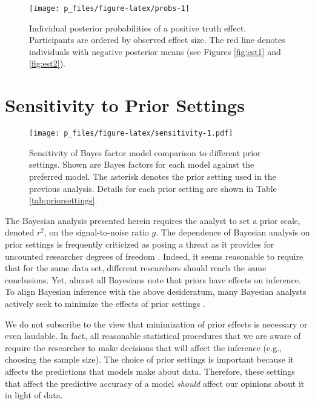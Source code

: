 \documentclass[
  english,
  ,man,floatsintext]{apa6}
\begin{document}
\begin{figure}
\texttt{[image: p\_files/figure-latex/probs-1]} \caption{Individual posterior probabilities of a positive truth effect. Participants are ordered by observed effect size. The red line denotes individuals with negative posterior means (see Figures \ref{fig:est1} and \ref{fig:est2}).}\label{fig:probs}
\end{figure}

\hypertarget{sensitivity-to-prior-settings}{%
\section{Sensitivity to Prior Settings}\label{sensitivity-to-prior-settings}}

\begin{figure}
\centering
\texttt{[image: p\_files/figure-latex/sensitivity-1.pdf]}
\caption{\label{fig:sensitivity}Sensitivity of Bayes factor model comparison to different prior settings. Shown are Bayes factors for each model against the preferred model. The asterisk denotes the prior setting used in the previous analysis. Details for each prior setting are shown in Table \ref{tab:priorsettings}.}
\end{figure}

The Bayesian analysis presented herein requires the analyst to set a prior scale, denoted \(r^2\), on the signal-to-noise ratio \(g\). The dependence of Bayesian analysis on prior settings is frequently criticized as posing a threat as it provides for uncounted researcher degrees of freedom \autocite{Simmons:etal:2011}. Indeed, it seems reasonable to require that for the same data set, different researchers should reach the same conclusions. Yet, almost all Bayesians note that priors have effects on inference. To align Bayesian inference with the above desideratum, many Bayesian analysts actively seek to minimize the effects of prior settings \autocites[e.g.,][]{aitkin1991}{Gelman:etal:2004}{kruschke2013}{spiegelhalter2002}.

We do not subscribe to the view that minimization of prior effects is necessary or even laudable. In fact, all reasonable statistical procedures that we are aware of require the researcher to make decisions that will affect the inference (e.g., choosing the sample size). The choice of prior settings is important because it affects the predictions that models make about data. Therefore, these settings that affect the predictive accuracy of a model \emph{should} affect our opinions about it in light of data.
\end{document}
